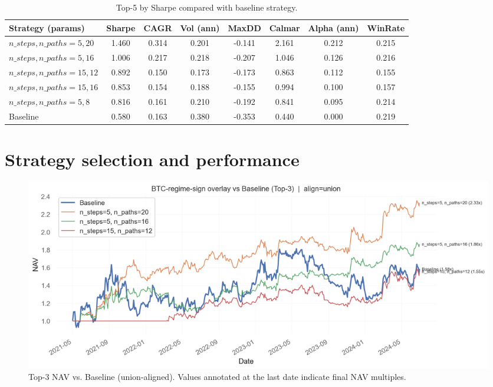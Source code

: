 \begin{table}[t]
\centering
\caption{Top-5 by Sharpe compared with baseline strategy.}
\label{tab:top5_sharpe_params}
\small
\begin{tabular}{lccccccc}
\toprule
Strategy (params) & Sharpe & CAGR & Vol (ann) & MaxDD & Calmar & Alpha (ann) & WinRate \\
\midrule
$n\_steps, n\_paths=5, 20$ & 1.460 & 0.314 & 0.201 & -0.141 & 2.161 & 0.212 & 0.215 \\
$n\_steps, n\_paths=5, 16$ & 1.006 & 0.217 & 0.218 & -0.207 & 1.046 & 0.126 & 0.216 \\
$n\_steps, n\_paths=15, 12$ & 0.892 & 0.150 & 0.173 & -0.173 & 0.863 & 0.112 & 0.155 \\
$n\_steps, n\_paths=15, 16$ & 0.853 & 0.154 & 0.188 & -0.155 & 0.994 & 0.100 & 0.157 \\
$n\_steps, n\_paths=5, 8$  & 0.816 & 0.161 & 0.210 & -0.192 & 0.841 & 0.095 & 0.214 \\
\hline
Baseline & 0.580 & 0.163 & 0.380 & -0.353 & 0.440 & 0.000 & 0.219 \\
\bottomrule
\end{tabular}
\end{table}


\section{Strategy selection and performance}\label{sec:results:top5}



\begin{figure}[t]
  \centering
  \includegraphics[width=\linewidth]{headline_plots/top3_nav_union.png}
  \caption{Top-3 NAV vs. Baseline (union-aligned). Values annotated at the last date indicate final NAV multiples.}
  \label{fig:top5_nav_union}
\end{figure}

